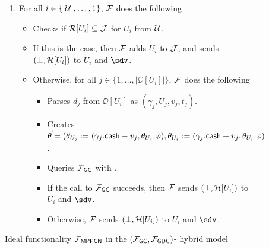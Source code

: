 \begin{figure*}[!t]
{{\begin{enumerate}
	
	\item For all $i \in \{|\mathcal{U}|,\ldots,1\}$, $\mathcal{F}$ does the following 
	\begin{itemize}[label=-]
		\item Checks if $\mathcal{R}[U_i] \subseteq \mathcal{J}$ for $U_i$ from $\mathcal{U}$.
		\item If this is the case, then $\mathcal{F}$ adds $U_i$ to $\mathcal{J}$, and sends $(\bot, \mathcal{H}[U_i])$ 
		to $U_i$ and $\sdv$.
		\item Otherwise, for all $j \in \{1,\ldots,|\DD[U_i]|\}$, $\mathcal{F}$ does the following
		\begin{itemize}[label=$\circ$]
			\item Parses $d_j$ from $\DD[U_i]$ as $(\gamma_j,U_j,v_j,t_j)$.
			\item Creates $\vec{\theta} = (\theta_{U_j} := (\gamma_j.\mathsf{cash} - v_j, \theta_{U_j}.
			\varphi), \theta_{U_i} := (\gamma_j.\mathsf{cash} + v_j, \theta_{U_i}.\varphi)$. 
			\item Queries $\mathcal{F}_{\mathsf{GC}}$ with .
			\item If the call to $\mathcal{F}_{\mathsf{GC}}$ succeeds, then $\mathcal{F}$ sends $(\top, \mathcal{H}[U_i])$ to 
			$U_i$ and $\sdv$.
			\item Otherwise, $\mathcal{F}$ sends $(\bot, \mathcal{H}[U_i])$ to $U_i$ and $\sdv$.
		\end{itemize}
	\end{itemize}
\end{enumerate}
}}



\caption{Ideal functionality $\mathcal{F}_{\mathsf{MPPCN}}$ in the $(\mathcal{F}_{\mathsf{GC}}, \mathcal{F}_{\mathsf{GDC}})$-
hybrid model}
\label{fig:ideal-mppcn}
\end{figure*}

